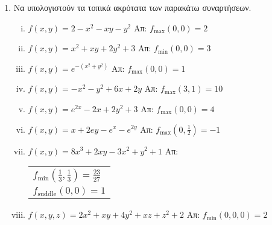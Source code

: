 


\thispagestyle{empty}



\begin{center}
\end{center}

\vspace{\baselineskip}

\begin{enumerate}
    \item Να υπολογιστούν τα τοπικά ακρότατα των παρακάτω συναρτήσεων.
        \begin{enumerate}[i)]

            \item $ f(x,y) = 2 - x^{2} - xy - y^{2} $ \hfill Απ: 
                $ f_{\text{max}}(0,0) = 2 $

            \item $ f(x,y) = x^{2} + xy + 2y^{2} + 3 $ \hfill Απ: 
                $ f_{\text{min}}(0,0) = 3 $

            \item $ f(x,y) = e^{-(x^{2} + y^{2})} $ \hfill Απ: 
                $ f_{\text{max}}(0,0) = 1  $

            \item $ f(x,y) = -x^{2} - y^{2} + 6x + 2y $ \hfill Απ: 
                $ f_{\text{max}}(3,1) = 10 $ 

            \item $ f(x,y) = e^{2x} - 2x + 2y^{2} + 3 $ \hfill Απ: 
                $ f_{\text{max}}(0,0) =4  $ 

            \item $ f(x,y) = x + 2ey - e^{x} - e^{2y} $ \hfill Απ: 
                $ f_{\text{max}}\left(0, \frac{1}{2}\right) = -1 $

            \item $ f(x,y) = 8x^{3} + 2xy - 3x^{2} + y^{2} + 1 $ \hfill Απ: 
                \begin{tabular}{l}
                    $ f_{\text{min}}\left(\frac{1}{3}, \frac{1}{3}\right) = 
                    \frac{23}{27} $ \\ 
                    $ f_{\text{suddle}}(0,0) = 1 $
                \end{tabular}

            \item $ f(x,y,z) = 2x^{2} + xy + 4y^{2} + xz + z^{2} + 2  $ \hfill Απ: 
                $ f_{\text{min}}(0,0,0) = 2 $


\end{enumerate}
\end{enumerate}
